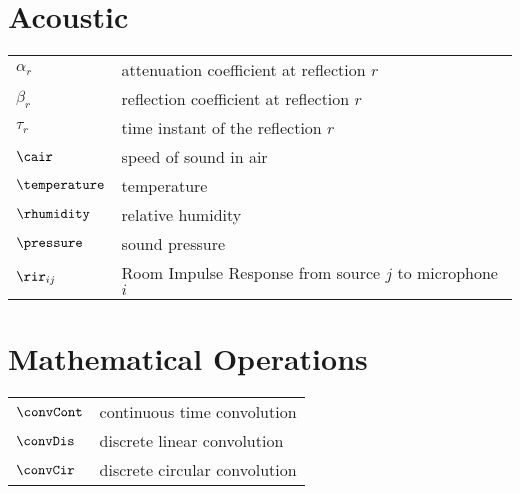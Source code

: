 \section*{Acoustic}
\begin{table}[H]
    \begin{tabular}{ll}
        $\alpha_{r}$    & attenuation coefficient at reflection $r$\\
        $\beta_{r}$     & reflection coefficient at reflection $r$\\
        $\tau_{r}$      & time instant of the reflection $r$\\
        $\cair$         & speed of sound in air\\
        $\temperature$  & temperature\\
        $\rhumidity$    & relative humidity\\
        $\pressure$     & sound pressure\\
        $\rir_{ij}$     & Room Impulse Response from source $j$ to microphone $i$ \\
    \end{tabular}
\end{table}

\section*{Mathematical Operations}
\begin{table}[H]
    \begin{tabular}{ll}
        $\convCont$          & continuous time convolution\\
        $\convDis$       & discrete linear convolution\\
        $\convCir$       & discrete circular convolution\\
    \end{tabular}
\end{table}


